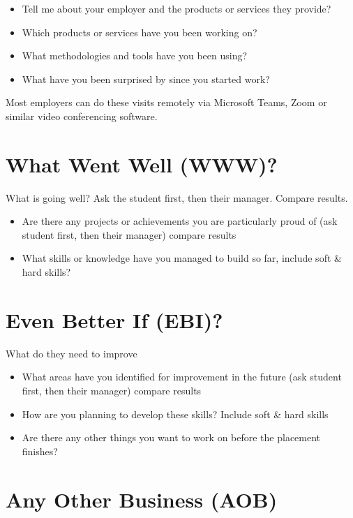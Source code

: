 \documentclass[
]{book}
\providecommand{\tightlist}{%
  \setlength{\itemsep}{0pt}\setlength{\parskip}{0pt}}
\begin{document}
\begin{itemize}
\tightlist
\item
  Tell me about your employer and the products or services they provide?
\item
  Which products or services have you been working on?
\item
  What methodologies and tools have you been using?
\item
  What have you been surprised by since you started work?
\end{itemize}

Most employers can do these visits remotely via Microsoft Teams, Zoom or similar video conferencing software.

\section{What Went Well (WWW)?}\label{www}

What is going well? Ask the student first, then their manager. Compare results.

\begin{itemize}
\tightlist
\item
  Are there any projects or achievements you are particularly proud of (ask student first, then their manager) compare results
\item
  What skills or knowledge have you managed to build so far, include soft \& hard skills?
\end{itemize}

\section{Even Better If (EBI)?}\label{ebi}

What do they need to improve

\begin{itemize}
\tightlist
\item
  What areas have you identified for improvement in the future (ask student first, then their manager) compare results
\item
  How are you planning to develop these skills? Include soft \& hard skills
\item
  Are there any other things you want to work on before the placement finishes?
\end{itemize}

\section{Any Other Business (AOB)}\label{aob}
\end{document}
